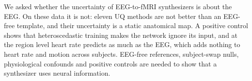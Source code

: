 We asked whether the uncertainty of EEG-to-fMRI synthesizers is about the EEG. On these data it is not: eleven UQ methods are not better than an EEG-free template, and their uncertainty is a static anatomical map. A positive control shows that heteroscedastic training makes the network ignore its input, and at the region level heart rate predicts as much as the EEG, which adds nothing to heart rate and motion across subjects. EEG-free references, subject-swap nulls, physiological confounds and positive controls are needed to show that a synthesizer uses neural information.
